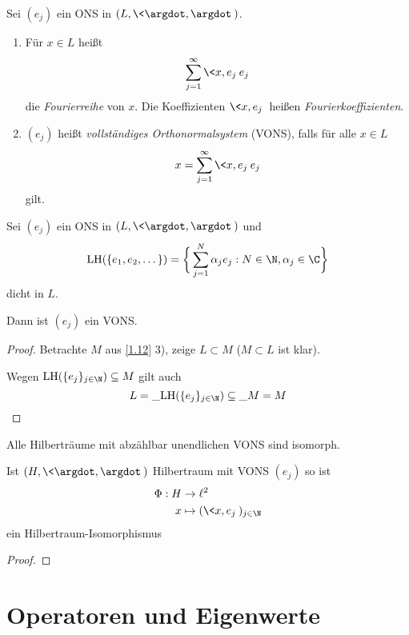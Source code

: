 \begin{df} \label{1.14}
	Sei $(e_j)$ ein ONS in $(L, \<\argdot,\argdot\>)$.
	\begin{enumerate}[1)]
		\item
			Für $x\in L$ heißt
			\[
				\sum_{j=1}^\infty \<x,e_j\> e_j
			\]
			die \emph{Fourierreihe} von $x$.
			Die Koeffizienten $\<x,e_j\>$ heißen \emph{Fourierkoeffizienten}.
		\item
			$(e_j)$ heißt \emph{vollständiges Orthonormalsystem} (VONS), falls für alle $ x\in L $
			\[
				x = \sum_{j=1}^\infty \<x,e_j\> e_j
			\]
			gilt.
	\end{enumerate}
\end{df}

\begin{nt} \label{1.15}
	Sei $(e_j)$ ein ONS in $(L, \<\argdot,\argdot\>)$ und
	\[
		\LH(\{e_1,e_2,\dotsc\}) = \bigg\{ \sum_{j=1}^N \alpha_j e_j : N \in \N, \alpha_j \in \C \bigg\}
	\]
	dicht in $L$.

	Dann ist $(e_j)$ ein VONS.
	\begin{proof}
		Betrachte $M$ aus \ref{1.12} 3), zeige $L \subset M$ ($M \subset L$ ist klar).

		Wegen $\LH(\{e_j\}_{j\in \N}) \subset M$ gilt auch
		\[
			L = \_{\LH(\{e_j\}_{j\in \N})} \subset \_{M} = M
		\]
	\end{proof}
\end{nt}

\begin{st} \label{1.16}
	Alle Hilberträume mit abzählbar unendlichen VONS sind isomorph. 

	Ist $(H,\<\argdot, \argdot\>)$ Hilbertraum mit VONS $(e_j)$ so ist
	\begin{align*}
		\Phi: H &\to \ell^2 \\
		x &\mapsto (\<x,e_j\>)_{j\in \N}
	\end{align*}
	ein Hilbertraum-Isomorphismus
	\begin{proof}
	\end{proof}
\end{st}



\section{Operatoren und Eigenwerte}



